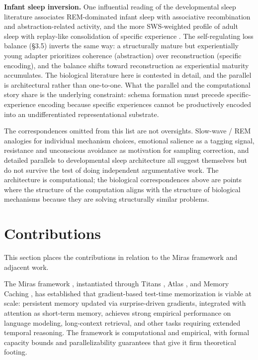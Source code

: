 \documentclass[11pt]{article}
\begin{document}
\textbf{Infant sleep inversion.} One influential reading of the developmental sleep literature associates REM-dominated infant sleep with associative recombination and abstraction-related activity, and the more SWS-weighted profile of adult sleep with replay-like consolidation of specific experience \cite{tononi2014}. The self-regulating loss balance (\S 3.5) inverts the same way: a structurally mature but experientially young adapter prioritizes coherence (abstraction) over reconstruction (specific encoding), and the balance shifts toward reconstruction as experiential maturity accumulates. The biological literature here is contested in detail, and the parallel is architectural rather than one-to-one. What the parallel and the computational story share is the underlying constraint: schema formation must precede specific-experience encoding because specific experiences cannot be productively encoded into an undifferentiated representational substrate.

The correspondences omitted from this list are not oversights. Slow-wave / REM analogies for individual mechanism choices, emotional salience as a tagging signal, resistance and unconscious avoidance as motivation for sampling correction, and detailed parallels to developmental sleep architecture all suggest themselves but do not survive the test of doing independent argumentative work. The architecture is computational; the biological correspondences above are points where the structure of the computation aligns with the structure of biological mechanisms because they are solving structurally similar problems.


\section{Contributions}

This section places the contributions in relation to the Miras framework and adjacent work.

The Miras framework \cite{behrouz2025miras}, instantiated through Titans \cite{behrouz2024titans}, Atlas \cite{behrouz2025atlas}, and Memory Caching \cite{behrouz2026memcache}, has established that gradient-based test-time memorization is viable at scale: persistent memory updated via surprise-driven gradients, integrated with attention as short-term memory, achieves strong empirical performance on language modeling, long-context retrieval, and other tasks requiring extended temporal reasoning. The framework is computational and empirical, with formal capacity bounds and parallelizability guarantees that give it firm theoretical footing.
\end{document}
